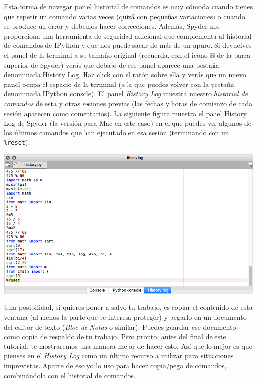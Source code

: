 \documentclass[10pt,a4paper]{article}\usepackage[]{graphicx}\usepackage[]{color}
\newcounter {cont01}
\begin{document}
Esta forma de navegar por el historial de comandos es muy cómoda cuando tienes que repetir un comando varias veces (quizá con pequeñas variaciones) o cuando se produce un error y debemos hacer correcciones. Además, Spyder nos proporciona una herramienta de seguridad adicional que complementa al historial de comandos de IPython y que nos puede sacar de más de un apuro. Si devuelves el panel de la terminal a su tamaño original (recuerda, con el icono \includegraphics[height=0.25cm]{../fig/Tut-02-py-19-IconoMaximizarPanel.png} de la barra superior de Spyder) verás que debajo de ese panel aparece una pestaña denominada 
{\sf History Log}. Haz click con el ratón sobre ella y verás que un nuevo panel ocupa el espacio de la terminal (a la que puedes volver con la pestaña denominada {\sf IPython console}). El panel {\em History Log} muestra nuestro {\em historial de comandos} de esta y otras sesiones previas (las fechas y horas de comienzo de cada sesión aparecen como comentarios). La siguiente figura muestra el panel History Log de Spyder (la versión para Mac en este caso) en el que puedes ver algunos de los últimos comandos que han ejecutado en esa sesión (terminando con un \verb&%reset&).

\begin{center}
\includegraphics[width=14cm]{../fig/Tut-02-py-21-PanelHistoryLog.png}
\end{center}

Una posibilidad, si quieres poner a salvo tu trabajo, es copiar el contenido de esta ventana (al menos la parte que te interesa proteger) y pegarlo en un documento del editor de texto ({\em Bloc de Notas} o similar). Puedes guardar ese documento como copia de respaldo de tu trabajo. Pero pronto, antes del final de este tutorial, te mostraremos una manera mejor de hacer esto. Así que lo mejor es que pienses en el {\em History Log} como un último recurso a utilizar para situaciones imprevistas. Aparte de eso yo lo uso para hacer copia/pega de comandos, combinándolo con el historial de comandos.
\end{document}
